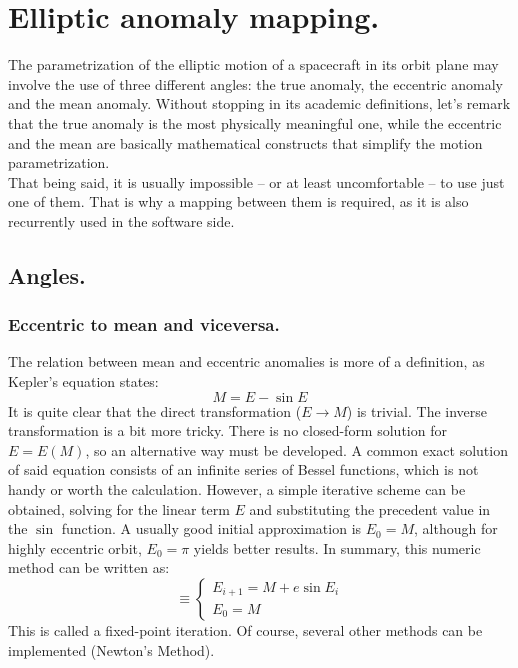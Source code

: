 \section{Elliptic anomaly mapping.}
%
\indent The parametrization of the elliptic motion of a spacecraft in its orbit plane may involve the use of three different angles: the true anomaly, the eccentric anomaly and the mean anomaly. Without stopping in its academic definitions, let's remark that the true anomaly is the most physically meaningful one, while the eccentric and the mean are basically mathematical constructs that simplify the motion parametrization.\\
%
\indent That being said, it is usually impossible -- or at least uncomfortable -- to use just one of them. That is why a mapping between them is required, as it is also recurrently used in the software side. 
%
	\subsection{Angles.}
		\subsubsection{Eccentric to mean and viceversa.}
		\indent The relation between mean and eccentric anomalies is more of a definition, as Kepler's equation states:
		\begin{equation}
		M = E - \sin E
		\label{eqAppE:Kepler_equation}
		\end{equation}
		\indent It is quite clear that the direct transformation (\ie $E\to  M$) is trivial. The inverse transformation is a bit more tricky. There is no closed-form solution for $E = E(M)$, so an alternative way must be developed. A common exact solution of said equation consists of an infinite series of Bessel functions, which is not handy or worth the calculation. However, a simple iterative scheme can be obtained, solving for the linear term $E$ and substituting the precedent value in the $\sin$ function. A usually good initial approximation is $E_0 = M$, although for highly eccentric orbit, $E_0 = \pi$ yields better results. In summary, this numeric method can be written as:
		\begin{equation}
		[P] \equiv \left\{ \begin{array}{ll}
		E_{i + 1} = M + e \sin E_i \\[1.2em]
		E_0 = M
		\end{array}\right.
		\label{eqAppE:mean2ecc}
		\end{equation}
		\indent This is called a fixed-point iteration. Of course, several other methods can be implemented (\eg Newton's Method).
		
